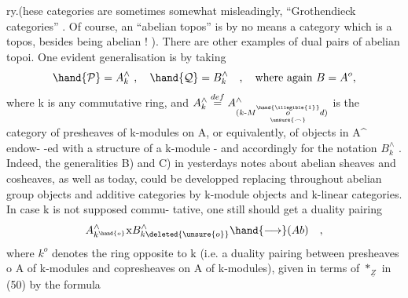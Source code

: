ry.(hese categories are sometimes\hand{,}  somewhat misleadingly,  
``Grothendieck categories'' .  Of course,  an ``abelian topos'' is by no
means a  category which is a topos,  besides being abelian ! ).  
There are  other examples of dual pairs of abelian topoi.  One evident
generalisation is by   taking
\[ \hand{\mathcal{P}} = A^{\wedge}_{k} \ , \quad \hand{\mathcal{Q}} = B^{\wedge}_{k} \quad , \quad \text{where again } B=A^{o} , \]
where k is any commutative ring,  and  $A^{\wedge}_{k} \overset{def}{=} A^{\wedge}_{(k\text{-}M\overset{\hand{\illegible{1}}}{\underset{\unsure{\frown}}{o}}d)}$  is the category
of presheaves of k-modules on A,  or equivalently,  of objects in A\^{} endow-%
-ed with a structure of a k-module  -  and accordingly for the notation
$B^{\wedge}_{k}$ .  Indeed,  the generalities B) and C)  in yesterdays notes about
abelian sheaves and cosheaves,  as well as today, could be developped
replacing throughout abelian group objects and additive categories by
k-module objects and k-linear categories.  In case k is not supposed commu-%
tative,  one still should get a duality pairing
\[ A^{\wedge}_{k^{\hand{o}}} \mathrm{x} B^{\wedge}_{k\deleted{\unsure{o}}} \hand{\longrightarrow} (Ab) \quad , \]
where $k^{o}$ denotes the ring opposite to k  (i.e.   a duality pairing
between presheaves o A of  k-modules\hand{,} and copresheaves on A of 
k-modules),  given in terms of  $*_{\underline{Z}}$  in (50)  by the formula

